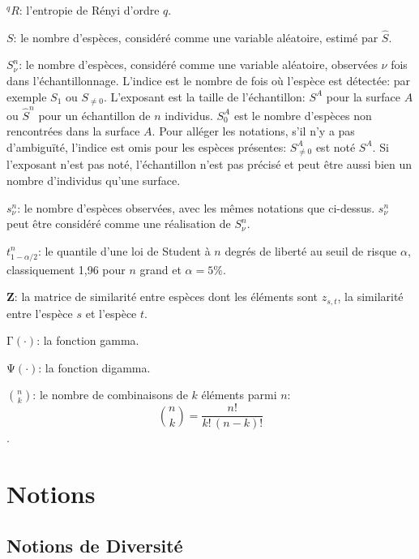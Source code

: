 \documentclass[
  11pt,
  french,
  a4paper,
  extrafontsizes,onecolumn,openright
  ]{memoir}
\begin{document}
\noindent \(^{q}\!R\): l'entropie de Rényi d'ordre \(q\).

\noindent \(S\): le nombre d'espèces, considéré comme une variable aléatoire, estimé par \(\hat{S}\).

\noindent \(S^{n}_{\nu}\): le nombre d'espèces, considéré comme une variable aléatoire, observées \(\nu\) fois dans l'échantillonnage.
L'indice est le nombre de fois où l'espèce est détectée: par exemple \(S_{1}\) ou \(S_{\ne 0}\).
L'exposant est la taille de l'échantillon: \(S^{A}\) pour la surface \(A\) ou \(\hat{S}^{n}\) pour un échantillon de \(n\) individus.
\(S^{A}_{0}\) est le nombre d'espèces non rencontrées dans la surface \(A\).
Pour alléger les notations, s'il n'y a pas d'ambiguïté, l'indice est omis pour les espèces présentes: \(S^{A}_{\ne 0}\) est noté \(S^{A}\).
Si l'exposant n'est pas noté, l'échantillon n'est pas précisé et peut être aussi bien un nombre d'individus qu'une surface.

\noindent \(s^{n}_{\nu}\): le nombre d'espèces observées, avec les mêmes notations que ci-dessus.
\(s^{n}_{\nu}\) peut être considéré comme une réalisation de \(S^{n}_{\nu}\).

\noindent \(t^{n}_{1-\alpha/2}\): le quantile d'une loi de Student à \(n\) degrés de liberté au seuil de risque \(\alpha\), classiquement 1,96 pour \(n\) grand et \(\alpha=5\%\).

\noindent \(\mathbf{Z}\): la matrice de similarité entre espèces dont les éléments sont \(z_{s,t}\), la similarité entre l'espèce \(s\) et l'espèce \(t\).

\noindent \(\mathrm{\Gamma}(\cdot)\): la fonction gamma.

\noindent \(\mathrm{\Psi}(\cdot)\): la fonction digamma.

\noindent \(\binom{n}{k}\): le nombre de combinaisons de \(k\) éléments parmi \(n\): \[\binom{n}{k}=\frac{n!}{k!\,(n-k)!}\].

\mainmatter

\hypertarget{part-notions}{%
\part{Notions}\label{part-notions}}

\hypertarget{notions-de-diversituxe9}{%
\chapter{Notions de Diversité}\label{notions-de-diversituxe9}}
\end{document}
